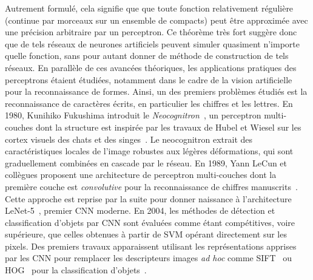 Autrement formulé, cela signifie que que toute fonction relativement régulière (continue par morceaux sur un ensemble de compacts) peut être approximée avec une précision arbitraire par un perceptron. Ce théorème très fort suggère donc que de tels réseaux de neurones artificiels peuvent simuler quasiment n'importe quelle fonction, sans pour autant donner de méthode de construction de tels réseaux. En parallèle de ces avancées théoriques, les applications pratiques des perceptrons étaient étudiées, notamment dans le cadre de la vision artificielle pour la reconnaissance de formes. Ainsi, un des premiers problèmes étudiés est la reconnaissance de caractères écrits, en particulier les chiffres et les lettres. En 1980, Kunihiko Fukushima introduit le \emph{Neocognitron}~\cite{fukushima_neocognitron_1980}, un perceptron multi-couches dont la structure est inspirée par les travaux de Hubel et Wiesel sur les cortex visuels des chats et des singes~\cite{hubel_receptive_1959,hubel_receptive_1968}. Le neocognitron extrait des caractéristiques locales de l'image robustes aux légères déformations, qui sont graduellement combinées en cascade par le réseau. En 1989, Yann LeCun et collègues proposent une architecture de perceptron multi-couches dont la première couche est \emph{convolutive} pour la reconnaissance de chiffres manuscrits~\cite{lecun_backpropagation_1989}. Cette approche est reprise par la suite pour donner naissance à l'architecture LeNet-5~\cite{lecun_gradient-based_1998}, premier \gls{CNN} moderne. En 2004, les méthodes de détection et classification d'objets par \gls{CNN} sont évaluées comme étant compétitives, voire supérieure, que celles obtenues à partir de \gls{SVM} opérant directement sur les pixels. Des premiers travaux apparaissent utilisant les représentations apprises par les \gls{CNN} pour remplacer les descripteurs images \emph{ad hoc} comme \gls{SIFT}~\cite{lowe_object_1999} ou \gls{HOG}~\cite{dalal_histograms_2005} pour la classification d'objets~\cite{serre_object_2005,huang_large-scale_2006}.

